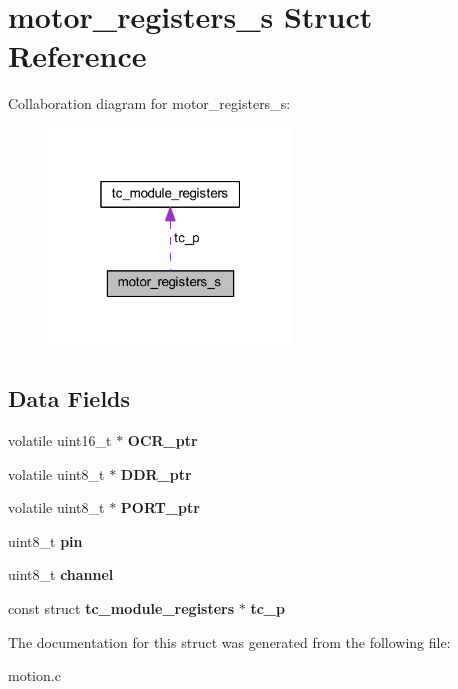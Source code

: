 \section{motor\+\_\+registers\+\_\+s Struct Reference}
\label{structmotor__registers__s}


Collaboration diagram for motor\+\_\+registers\+\_\+s\+:\nopagebreak
\begin{figure}[H]
\begin{center}
\leavevmode
\includegraphics[width=184pt]{structmotor__registers__s__coll__graph}
\end{center}
\end{figure}
\subsection*{Data Fields}
\begin{DoxyCompactItemize}
\item 
volatile uint16\+\_\+t $\ast$ {\bfseries O\+C\+R\+\_\+ptr}\label{structmotor__registers__s_a9e151bedf793f3664a8acb277988f23a}

\item 
volatile uint8\+\_\+t $\ast$ {\bfseries D\+D\+R\+\_\+ptr}\label{structmotor__registers__s_a69a589af1b6e1a8db9758d0f5fa65e37}

\item 
volatile uint8\+\_\+t $\ast$ {\bfseries P\+O\+R\+T\+\_\+ptr}\label{structmotor__registers__s_a530b045599b736fed1e8b6adcb9dcd5f}

\item 
uint8\+\_\+t {\bfseries pin}\label{structmotor__registers__s_a0b1799ba98f3c56dc72f51d490d2b00d}

\item 
uint8\+\_\+t {\bfseries channel}\label{structmotor__registers__s_a759cd205c48cbbd49b0722c44d7a6717}

\item 
const struct {\bf tc\+\_\+module\+\_\+registers} $\ast$ {\bfseries tc\+\_\+p}\label{structmotor__registers__s_a99085fa10e4e9ef7cf0a2537abbd6ab2}

\end{DoxyCompactItemize}


The documentation for this struct was generated from the following file\+:\begin{DoxyCompactItemize}
\item 
motion.\+c\end{DoxyCompactItemize}
